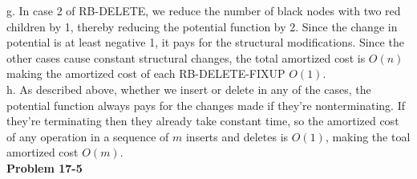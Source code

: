 \documentclass{article}
\begin{document}
g. In case 2 of RB-DELETE, we reduce the number of black nodes with two red children by 1, thereby reducing the potential function by 2.  Since the change in potential is at least negative 1, it pays for the structural modifications.  Since the other cases cause constant structural changes, the total amortized cost is $O(n)$ making the amortized cost of each RB-DELETE-FIXUP $O(1)$.\\

h. As described above, whether we insert or delete in any of the cases, the potential function always pays for the changes made if they're nonterminating.  If they're terminating then they already take constant time, so the amortized cost of any operation in a sequence of $m$ inserts and deletes is $O(1)$, making the toal amortized cost $O(m)$. \\


\noindent\textbf{Problem 17-5}\\
\end{document}
